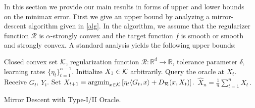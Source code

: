 In this section we provide our main results in forms of upper and lower bounds on the minimax error.
First we give an upper bound by analyzing a mirror-descent algorithm given in \cref{alg}.
In the algorithm, we assume that the regularizer function $\mathcal{R}$ is $\alpha$-strongly convex and the target function $f$ is smooth or  smooth and strongly convex. A standard analysis yields the following upper bounds:

%

\begin{algorithm}[t]
\begin{algorithmic}
      Closed convex set $\mathcal{K}$, regularization function $\mathcal{R}:\mathbb{R}^d\to \mathbb{R}$, tolerance parameter $\delta$, learning rates $\{\eta_t\}_{t=1}^{n-1}$.
\State Initialize $X_1\in \mathcal{K}$ arbitrarily.
	\State Query the oracle at $X_t$.
	\State Receive $G_t$, $Y_t$.
	\State Set
	$X_{t+1}=\operatorname{argmin}_{x\in \mathcal{K}}\left[ \eta_{t} \langle G_t,x \rangle+D_{\mathcal{R}}(x,X_t) \right].$
\EndFor
{} $\hat{X}_n = \frac{1}{n}\sum_{t=1}^n X_t \,.$
\end{algorithmic}
\caption{Mirror Descent with Type-I/II Oracle.}
\label{alg}
\end{algorithm}


%

